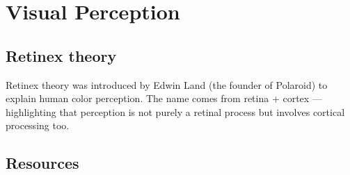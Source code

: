 \chapter{Visual Perception}

\section{Retinex theory}

Retinex theory was introduced by Edwin Land (the founder of Polaroid)
to explain human color perception. The name comes from retina + cortex
— highlighting that perception is not purely a retinal process but
involves cortical processing too.

\section{Resources}


